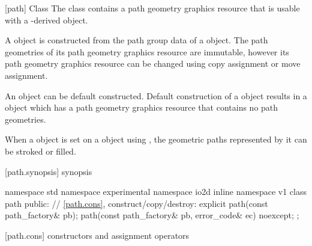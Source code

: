  [path] {Class }
\pnum
{}
The class  contains a path geometry graphics resource that is usable with a -derived object.

\pnum
A  object is constructed from the path group data of a  object. The path geometries of its path geometry graphics resource are immutable, however its path geometry graphics resource can be changed using copy assignment or move assignment.

\pnum
An  object can be default constructed. Default construction of a  object results in a  object which has a path geometry graphics resource that contains no path geometries.

\pnum
When a  object is set on a  object using 
, the geometric paths represented by it can be 
stroked or filled.

%
 [path.synopsis] { synopsis}

\begin{codeblock}
namespace std { namespace experimental { namespace io2d { inline namespace v1 {
  class path {
    public:
    // \ref{path.cons}, construct/copy/destroy:
    explicit path(const path_factory& pb);
    path(const path_factory& pb, error_code& ec) noexcept;
  };
} } } }
\end{codeblock}

 [path.cons] { constructors and assignment operators}

